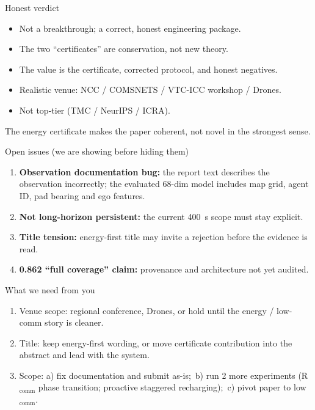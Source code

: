 \documentclass[aspectratio=169,10pt]{beamer}
\begin{document}
\begin{frame}{Honest verdict}
  \begin{itemize}
    \item Not a breakthrough; a correct, honest engineering package.
    \item The two ``certificates'' are conservation, not new theory.
    \item The value is the certificate, corrected protocol, and honest negatives.
    \item Realistic venue: NCC / COMSNETS / VTC-ICC workshop / Drones.
    \item Not top-tier (TMC / NeurIPS / ICRA).
  \end{itemize}
  \vspace{0.2cm}
  {\footnotesize The energy certificate makes the paper coherent, not novel in the strongest sense.}
\end{frame}

\begin{frame}{Open issues (we are showing before hiding them)}
  \begin{enumerate}
    \item \textbf{Observation documentation bug:} the report text describes the observation incorrectly; the evaluated 68-dim model includes map grid, agent ID, pad bearing and ego features.
    \item \textbf{Not long-horizon persistent:} the current 400~s scope must stay explicit.
    \item \textbf{Title tension:} energy-first title may invite a rejection before the evidence is read.
    \item \textbf{0.862 ``full coverage'' claim:} provenance and architecture not yet audited.
  \end{enumerate}
\end{frame}

\begin{frame}{What we need from you}
  \begin{enumerate}
    \item Venue scope: regional conference, Drones, or hold until the energy / low-comm story is cleaner.
    \item Title: keep energy-first wording, or move certificate contribution into the abstract and lead with the system.
    \item Scope:\; a) fix documentation and submit as-is;\;\ b) run 2 more experiments (R$_{\mathrm{comm}}$ phase transition; proactive staggered recharging);\;\ c) pivot paper to low$_{\mathrm{comm}}$.
  \end{enumerate}
\end{frame}
\end{document}
